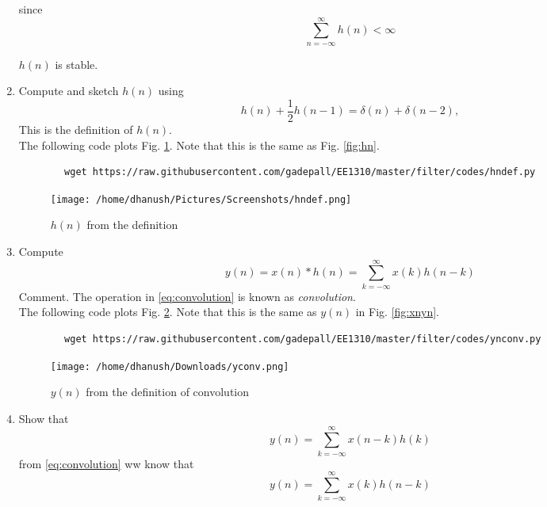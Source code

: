 \documentclass[journal,12pt,twocolumn]{IEEEtran}
\renewcommand\thesection{\arabic{section}}
\begin{document}
\begin{enumerate}[label=\thesection.\arabic*]
	since 
	\begin{equation}
		\sum_{n=-\infty}^{\infty}h(n) < \infty
	\end{equation}
	
	$h(n)$ is stable.
	
	\item 
	Compute and sketch $h(n)$ using 
	\begin{equation}
		\label{eq:iir_filter_h}
		h(n) + \frac{1}{2}h(n-1) = \delta(n) + \delta(n-2), 
	\end{equation}
	This is the definition of $h(n)$.
	\\
	\solution The following code plots Fig. \ref{fig:hndef}. Note that this is the same as Fig. 
	\ref{fig:hn}. 
	\begin{lstlisting}
		wget https://raw.githubusercontent.com/gadepall/EE1310/master/filter/codes/hndef.py
	\end{lstlisting}
	\begin{figure}[!ht]
		\centering
		\texttt{[image: /home/dhanush/Pictures/Screenshots/hndef.png]}
		\caption{$h(n)$ from the definition}
		\label{fig:hndef}
	\end{figure}
	\item Compute 
	\begin{equation}
		\label{eq:convolution}
		y(n) = x(n)*h(n) = \sum_{k=-\infty}^{\infty}x(k)h(n-k)
	\end{equation}
	Comment. The operation in \eqref{eq:convolution} is known as
	{\em convolution}.
	\\
	\solution The following code plots Fig. \ref{fig:ynconv}. Note that this is the same as 
	$y(n)$ in  Fig. 
	\ref{fig:xnyn}. 
	\begin{lstlisting}
		wget https://raw.githubusercontent.com/gadepall/EE1310/master/filter/codes/ynconv.py
	\end{lstlisting}
	\begin{figure}[!ht]
		\centering
		\texttt{[image: /home/dhanush/Downloads/yconv.png]}
		\caption{$y(n)$ from the definition of convolution}
		\label{fig:ynconv}
	\end{figure}
	
	\item Show that
	\begin{equation}
		y(n) =  \sum_{k=-\infty}^{\infty}x(n-k)h(k)
	\end{equation}
	\solution from \ref{eq:convolution} ww know that
	\begin{equation}
		y(n) =  \sum_{k=-\infty}^{\infty}x(k)h(n-k) \label{eq:1st}
	\end{equation}
	

\end{enumerate}
\end{document}

